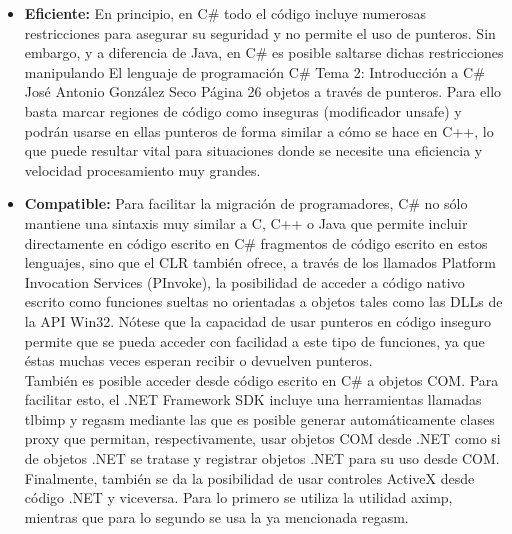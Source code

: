 \begin{itemize}
\begin{itemize}
		\item Si no se considera redefinici\'on, entonces se considera que lo que se desea es ocultar el m\'etodo de la clase padre, de modo que para la clase hija sea como si nunca hubiese existido. El compilador avisar\'a de esta decisi\'on a trav\'es de un mensaje de aviso que puede suprimirse incluyendo el modificador new en la definici\'on del miembro en la clase hija para as\'i indicarle expl\'icitamente la intenci\'on de ocultaci\'on. 
	\end{itemize}

	\item \textbf{Eficiente: } En principio, en C\# todo el c\'odigo incluye numerosas restricciones para asegurar su seguridad y no permite el uso de punteros. Sin embargo, y a diferencia de Java, en C\# es posible saltarse dichas restricciones manipulando El lenguaje de programaci\'on C\# Tema 2: Introducci\'on a C\# Jos\'e Antonio Gonz\'alez Seco P\'agina 26 objetos a trav\'es de punteros. Para ello basta marcar regiones de c\'odigo como inseguras (modificador unsafe) y podr\'an usarse en ellas punteros de forma similar a c\'omo se hace en C++, lo que puede resultar vital para situaciones donde se necesite una eficiencia y velocidad procesamiento muy grandes. 

	\item \textbf{Compatible: } Para facilitar la migraci\'on de programadores, C\# no s\'olo mantiene una sintaxis muy similar a C, C++ o Java que permite incluir directamente en c\'odigo escrito en C\# fragmentos de c\'odigo escrito en estos lenguajes, sino que el CLR tambi\'en ofrece, a trav\'es de los llamados Platform Invocation Services (PInvoke), la posibilidad de acceder a c\'odigo nativo escrito como funciones sueltas no orientadas a objetos tales como las DLLs de la API Win32. N\'otese que la capacidad de usar punteros en c\'odigo inseguro permite que se pueda acceder con facilidad a este tipo de funciones, ya que \'estas muchas veces esperan recibir o devuelven punteros.\\

	Tambi\'en es posible acceder desde c\'odigo escrito en C\# a objetos COM. Para facilitar esto, el .NET Framework SDK incluye una herramientas llamadas tlbimp y regasm mediante las que es posible generar autom\'aticamente clases proxy que permitan, respectivamente, usar objetos COM desde .NET como si de objetos .NET se tratase y registrar objetos .NET para su uso desde COM.\\

	Finalmente, tambi\'en se da la posibilidad de usar controles ActiveX desde c\'odigo .NET y viceversa. Para lo primero se utiliza la utilidad aximp, mientras que para lo segundo se usa la ya mencionada regasm.
\end{itemize}

